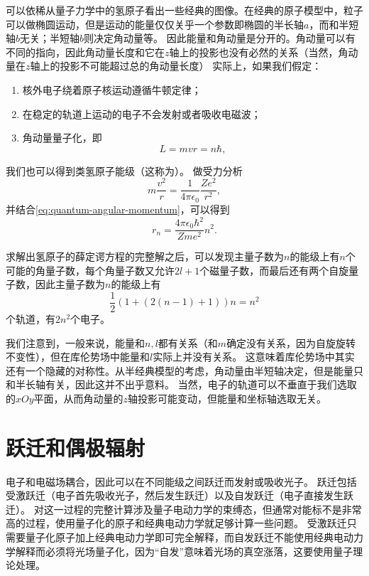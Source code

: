 可以依稀从量子力学中的氢原子看出一些经典的图像。在经典的原子模型中，粒子可以做椭圆运动，但是运动的能量仅仅关乎一个参数即椭圆的半长轴$a$，而和半短轴$b$无关；半短轴$b$则决定角动量等。
因此能量和角动量是分开的。角动量可以有不同的指向，因此角动量长度和它在$z$轴上的投影也没有必然的关系（当然，角动量在$z$轴上的投影不可能超过总的角动量长度）
实际上，如果我们假定：
\begin{enumerate}
    \item 核外电子绕着原子核运动遵循牛顿定律；
    \item 在稳定的轨道上运动的电子不会发射或者吸收电磁波；
    \item 角动量量子化，即
    \begin{equation}
        L = m v r = n \hbar,
        \label{eq:quantum-angular-momentum}
    \end{equation}
\end{enumerate}
我们也可以得到类氢原子能级（这称为）。
做受力分析
\[
    m \frac{v^2}{r} = \frac{1}{4\pi \epsilon_0} \frac{Z e^2}{r^2},
\]
并结合\eqref{eq:quantum-angular-momentum}，可以得到
\begin{equation}
    r_n = \frac{4\pi \epsilon_0 \hbar^2}{Zme^2} n^2.
\end{equation}

求解出氢原子的薛定谔方程的完整解之后，可以发现主量子数为$n$的能级上有$n$个可能的角量子数，每个角量子数又允许$2l+1$个磁量子数，而最后还有两个自旋量子数，因此主量子数为$n$的能级上有
\[
    \frac{1}{2} (1 + (2(n-1)+1)) n = n^2
\]
个轨道，有$2n^2$个电子。

我们注意到，一般来说，能量和$n, l$都有关系（和$m$确定没有关系，因为自旋旋转不变性），但在库伦势场中能量和$l$实际上并没有关系。
这意味着库伦势场中其实还有一个隐藏的对称性。从半经典模型的考虑，角动量由半短轴决定，但是能量只和半长轴有关，因此这并不出乎意料。
当然，电子的轨道可以不垂直于我们选取的$xOy$平面，从而角动量的$z$轴投影可能变动，但能量和坐标轴选取无关。

\section{跃迁和偶极辐射}\label{sec:electro-dipole}

电子和电磁场耦合，因此可以在不同能级之间跃迁而发射或吸收光子。
跃迁包括受激跃迁（电子首先吸收光子，然后发生跃迁）以及自发跃迁（电子直接发生跃迁）。
对这一过程的完整计算涉及量子电动力学的束缚态，但通常对能标不是非常高的过程，使用量子化的原子和经典电动力学就足够计算一些问题。
受激跃迁只需要量子化原子加上经典电动力学即可完全解释，而自发跃迁不能使用经典电动力学解释而必须将光场量子化，因为“自发”意味着光场的真空涨落，这要使用量子理论处理。

